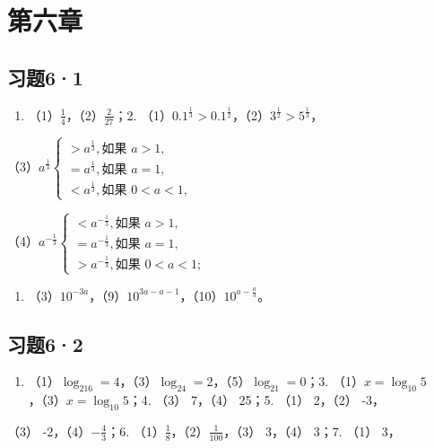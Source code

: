 \section{第六章}

\subsection{习题6·1}

\begin{enumerate}
\item
  （1）\(\frac{1}{4}\)，（2）\(\frac{2}{27}\)；2.
  （1）\(0.1^{\frac{1}{3}} > 0.1^{\frac{1}{2}}\)，（2）\(3^{\frac{1}{2}} > 5^{\frac{1}{3}}\)，
\end{enumerate}

（3）\(a^{\frac{1}{3}}\left\{ \begin{array}{l} > a^{\frac{1}{3}}, \text{如果 } a > 1, \\ = a^{\frac{1}{3}}, \text{如果 } a = 1, \\ < a^{\frac{1}{3}}, \text{如果 } 0 < a < 1, \end{array} \right.\)

（4）\(a^{-\frac{1}{3}}\left\{ \begin{array}{l} < a^{-\frac{1}{3}}, \text{如果 } a > 1, \\ = a^{-\frac{1}{3}}, \text{如果 } a = 1, \\ > a^{-\frac{1}{3}}, \text{如果 } 0 < a < 1; \end{array} \right.\)

\begin{enumerate}[start=3]
\item
  （3）\(10^{-3a}\)，（9）\(10^{3a - a - 1}\)，（10）\(10^{a - \frac{a}{3}}\)。
\end{enumerate}

\subsection{习题6·2}

\begin{enumerate}
\item
  （1）\(\log_216 = 4\)，（3）\(\log_24 = 2\)，（5）\(\log_21 = 0\)；3.
  （1）\(x = \log_{10} 5\)，（3）\(x = \log_{10} 5\)；4. （3） 7，（4）
  25；5. （1） 2，（2） -3，
\end{enumerate}

（3） -2，（4）\(-\frac{4}{3}\)；6.
（1）\(\frac{1}{8}\)，（2）\(\frac{1}{100}\)，（3） 3，（4） 3；7. （1）
3，

